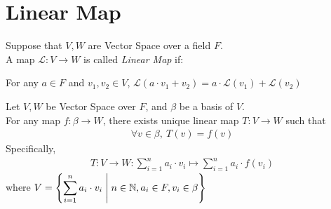 \section{Linear Map}
\begin{definition}
    Suppose that $V, W$ are Vector Space over a field $F$.\\
    A map $\mathcal{L}:V \to W$ is called \textit{Linear Map} if:
    \begin{center}
        For any $a \in F$ and $v_1, v_2 \in V$, $\mathcal{L}(a \cdot v_1 + v_2) = a \cdot \mathcal{L}(v_1) + \mathcal{L}(v_2)$
    \end{center}
\end{definition}

\begin{theorem}
    Let $V, W$ be Vector Space over $F$, and $\beta$ be a basis of $V$. \\
    For any map $f:\beta \to W$, there exists unique linear map $T:V \to W$ such that
    \begin{align*}
        \forall v \in \beta,\ T(v) = f(v)
    \end{align*}
    Specifically,
    \begin{align*}
        T:V \to W: \sum_{i=1}^{n} a_i \cdot v_i \mapsto \sum_{i=1}^{n} a_i \cdot f(v_i)
    \end{align*}
    where $\displaystyle V = \left\{ \sum_{i=1}^{n} a_i \cdot v_i \;\middle|\; n \in \mathbb{N}, a_i \in F, v_i \in \beta \right\}$
\end{theorem}
